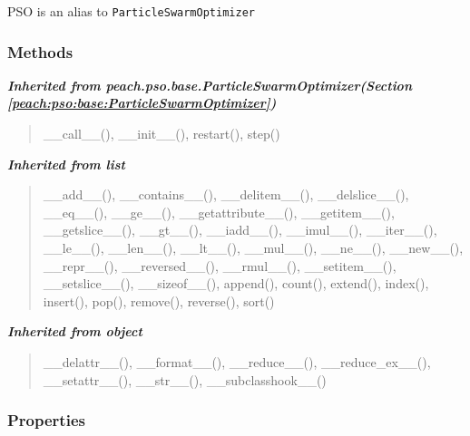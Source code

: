 PSO is an alias to \texttt{ParticleSwarmOptimizer}


  \subsubsection{Methods}


\large{\textbf{\textit{Inherited from peach.pso.base.ParticleSwarmOptimizer\textit{(Section \ref{peach:pso:base:ParticleSwarmOptimizer})}}}}

\begin{quote}
\_\_call\_\_(), \_\_init\_\_(), restart(), step()
\end{quote}

\large{\textbf{\textit{Inherited from list}}}

\begin{quote}
\_\_add\_\_(), \_\_contains\_\_(), \_\_delitem\_\_(), \_\_delslice\_\_(), \_\_eq\_\_(), \_\_ge\_\_(), \_\_getattribute\_\_(), \_\_getitem\_\_(), \_\_getslice\_\_(), \_\_gt\_\_(), \_\_iadd\_\_(), \_\_imul\_\_(), \_\_iter\_\_(), \_\_le\_\_(), \_\_len\_\_(), \_\_lt\_\_(), \_\_mul\_\_(), \_\_ne\_\_(), \_\_new\_\_(), \_\_repr\_\_(), \_\_reversed\_\_(), \_\_rmul\_\_(), \_\_setitem\_\_(), \_\_setslice\_\_(), \_\_sizeof\_\_(), append(), count(), extend(), index(), insert(), pop(), remove(), reverse(), sort()
\end{quote}

\large{\textbf{\textit{Inherited from object}}}

\begin{quote}
\_\_delattr\_\_(), \_\_format\_\_(), \_\_reduce\_\_(), \_\_reduce\_ex\_\_(), \_\_setattr\_\_(), \_\_str\_\_(), \_\_subclasshook\_\_()
\end{quote}


  \subsubsection{Properties}

